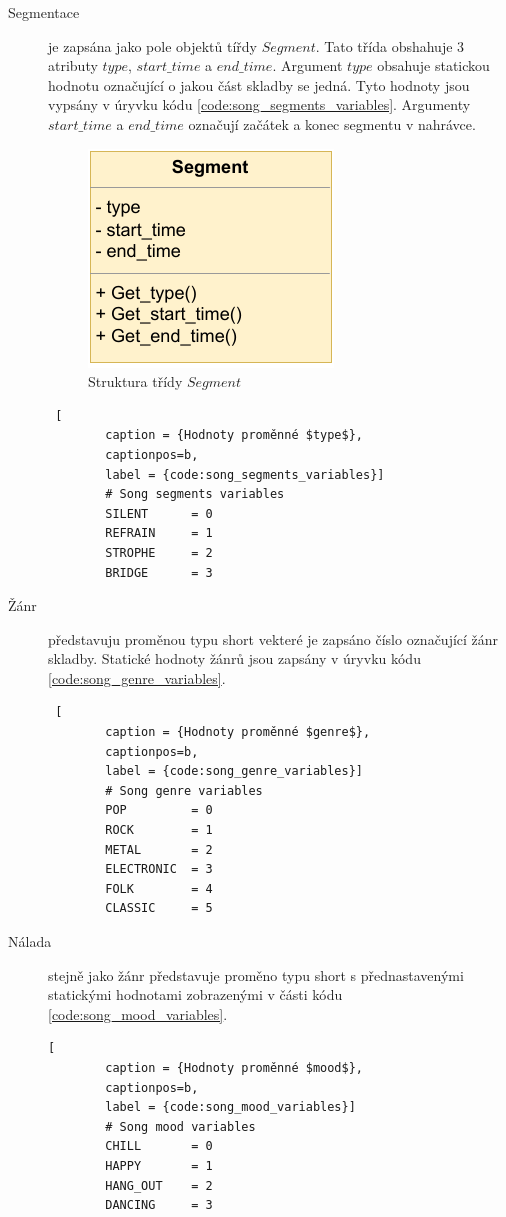 \begin{description}
    \item[Segmentace] je zapsána jako pole objektů tířdy $Segment$. Tato třída obshahuje 3 atributy $type$, $start\_time$ a $end\_time$. Argument $type$ obsahuje statickou hodnotu označující o jakou část skladby se jedná. Tyto hodnoty jsou vypsány v úryvku kódu \ref{code:song_segments_variables}.
    Argumenty $start\_time$ a $end\_time$ označují začátek a konec segmentu v nahrávce. 

    \begin{figure}[H]
        \centering
        \includegraphics[width = 0.3\linewidth]{obrazky/UML_diagram_Segment.pdf}
        \caption{Struktura třídy $Segment$}
        \label{fig:Loudness_Segment_diagram}
    \end{figure}
    \begin{lstlisting} [
        caption = {Hodnoty proměnné $type$},
        captionpos=b,
        label = {code:song_segments_variables}]
        # Song segments variables
        SILENT      = 0
        REFRAIN     = 1
        STROPHE     = 2
        BRIDGE      = 3
    \end{lstlisting}

    \item[Žánr] představuju proměnou typu short vekteré je zapsáno číslo označující žánr skladby. Statické hodnoty žánrů jsou zapsány v úryvku kódu \ref{code:song_genre_variables}.
    \begin{lstlisting} [
        caption = {Hodnoty proměnné $genre$},
        captionpos=b,
        label = {code:song_genre_variables}]
        # Song genre variables
        POP         = 0
        ROCK        = 1
        METAL       = 2
        ELECTRONIC  = 3
        FOLK        = 4
        CLASSIC     = 5
    \end{lstlisting}
    \item[Nálada] stejně jako žánr představuje proměno typu short s přednastavenými statickými hodnotami zobrazenými v části kódu \ref{code:song_mood_variables}.
    \begin{lstlisting}[
        caption = {Hodnoty proměnné $mood$},
        captionpos=b,
        label = {code:song_mood_variables}]
        # Song mood variables
        CHILL       = 0
        HAPPY       = 1
        HANG_OUT    = 2
        DANCING     = 3
    \end{lstlisting}
    
\end{description}
